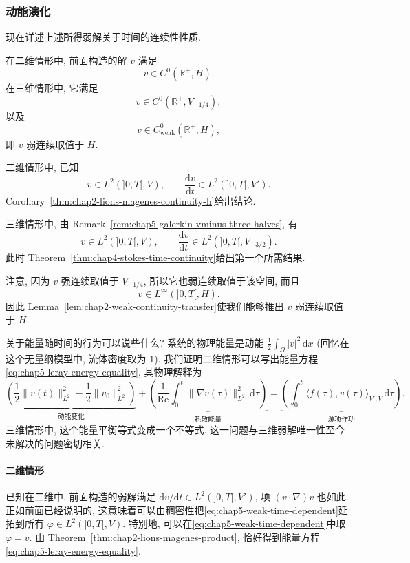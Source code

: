 \subsubsection{动能演化}
\label{subsec:chap5-kinetic-energy}

现在详述上述所得弱解关于时间的连续性性质.

\begin{Proposition}
\label{prop:chap5-weak-solution-time-continuity}
在二维情形中, 前面构造的解 $v$ 满足
\[
 v\in C^0(\mathbb R^+,H).
\]
在三维情形中, 它满足
\[
 v\in C^0(\mathbb R^+,V_{-1/4}),
\]
以及
\[
 v\in C_{\mathrm{weak}}^0(\mathbb R^+,H),
\]
即 $v$ 弱连续取值于 $H$.
\end{Proposition}

\begin{Proof}
二维情形中, 已知
\[
 v\in L^2(]0,T[,V),
 \qquad
 \frac{\mathrm dv}{\mathrm dt}\in L^2(]0,T[,V').
\]
Corollary~\ref{thm:chap2-lions-magenes-continuity-h}给出结论.

三维情形中, 由 Remark~\ref{rem:chap5-galerkin-vminus-three-halves}, 有
\[
 v\in L^2(]0,T[,V),
 \qquad
 \frac{\mathrm dv}{\mathrm dt}\in L^2(]0,T[,V_{-3/2}).
\]
此时 Theorem~\ref{thm:chap4-stokes-time-continuity}给出第一个所需结果.

注意, 因为 $v$ 强连续取值于 $V_{-1/4}$, 所以它也弱连续取值于该空间, 而且
\[
 v\in L^\infty(]0,T[,H).
\]
因此 Lemma~\ref{lem:chap2-weak-continuity-transfer}使我们能够推出 $v$ 弱连续取值于 $H$.
\end{Proof}

关于能量随时间的行为可以说些什么? 系统的物理能量是动能 $\frac12\int_\Omega|v|^2\,\mathrm dx$ (回忆在这个无量纲模型中, 流体密度取为 $1$). 我们证明二维情形可以写出能量方程\eqref{eq:chap5-leray-energy-equality}, 其物理解释为
\[
 \underbrace{\left(\frac12\|v(t)\|_{L^2}^2-\frac12\|v_0\|_{L^2}^2\right)}_{\text{动能变化}}
 +\underbrace{\left(\frac1{\operatorname{Re}}\int_0^t\|\nabla v(\tau)\|_{L^2}^2\,\mathrm d\tau\right)}_{\text{耗散能量}}
 =\underbrace{\left(\int_0^t\langle f(\tau),v(\tau)\rangle_{V',V}\,\mathrm d\tau\right)}_{\text{源项作功}}.
\]
三维情形中, 这个能量平衡等式变成一个不等式. 这一问题与三维弱解唯一性至今未解决的问题密切相关.

\paragraph{二维情形}

已知在二维中, 前面构造的弱解满足 $\mathrm dv/\mathrm dt\in L^2(]0,T[,V')$, 项 $(v\cdot\nabla)v$ 也如此. 正如前面已经说明的, 这意味着可以由稠密性把\eqref{eq:chap5-weak-time-dependent}延拓到所有 $\varphi\in L^2(]0,T[,V)$. 特别地, 可以在\eqref{eq:chap5-weak-time-dependent}中取 $\varphi=v$. 由 Theorem~\ref{thm:chap2-lions-magenes-product}, 恰好得到能量方程\eqref{eq:chap5-leray-energy-equality}.

